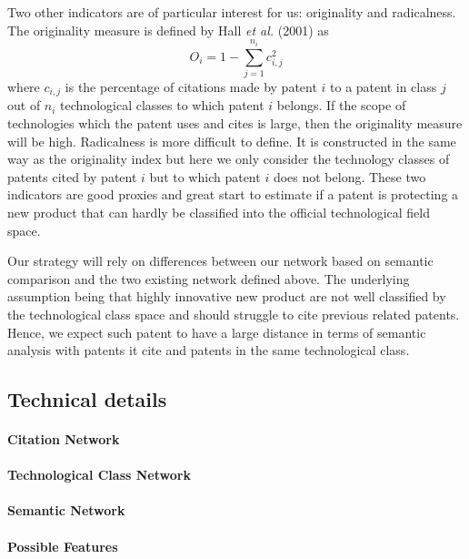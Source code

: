 Two other indicators are of particular interest for us: originality and radicalness. The originality measure is
defined by Hall \textit{et al.} (2001) \cite{Hall2001} as
\[
O_{i}%
=1-\sum_{j=1}^{n_{i}}{c_{i,j}^{2}}\] where $c_{i,j}$
is the
percentage of citations made by patent $i$ to a patent in class $j$ out of
$n_{i}$ technological classes to which patent $i$ belongs. If the scope of
technologies which the patent uses and cites is large, then the originality
measure will be high. Radicalness is more difficult to define. It is
constructed in the same way as the originality index but here we only consider
the technology classes of patents cited by patent $i$ but to which patent $i$
does not belong. These two indicators are good proxies and great start to estimate if a patent is protecting a new product that can hardly be classified into the official technological field space.

Our strategy will rely on differences between our network based on semantic comparison and the two existing network defined above. The underlying assumption being that highly innovative new product are not well classified by the technological class space and should struggle to cite previous related patents. Hence, we expect such patent to have a large distance in terms of semantic analysis with patents it cite and patents in the same technological class.


\subsection{Technical details}


\paragraph{Citation Network}


\paragraph{Technological Class Network}


\paragraph{Semantic Network}




\paragraph{Possible Features}





